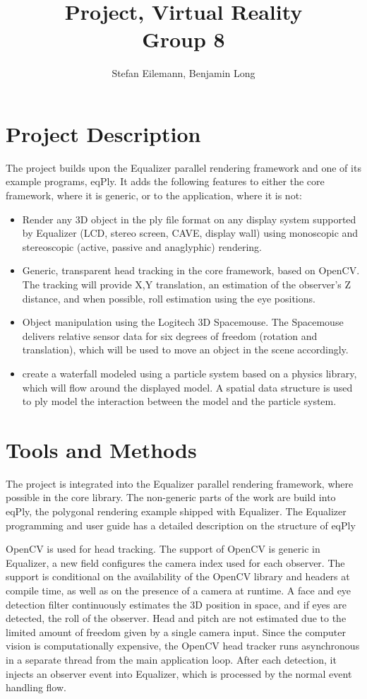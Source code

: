 \documentclass[10pt,a4]{scrartcl}
\title{Project, Virtual Reality\\Group 8}
\author{Stefan Eilemann, Benjamin Long}
\begin{document}
\maketitle

\section{Project Description}

The project builds upon the Equalizer parallel rendering framework and one of
its example programs, eqPly. It adds the following features to either the
core framework, where it is generic, or to the application, where it is not:
\begin{itemize}
\item Render any 3D object in the ply file format on any display system
  supported by Equalizer (LCD, stereo screen, CAVE, display wall) using
  monoscopic and stereoscopic (active, passive and anaglyphic) rendering.
\item Generic, transparent head tracking in the core framework, based on
  OpenCV. The tracking will provide X,Y translation, an estimation of the
  observer's Z distance, and when possible, roll estimation using the eye
  positions.
\item Object manipulation using the Logitech 3D Spacemouse. The Spacemouse
  delivers relative sensor data for six degrees of freedom (rotation and
  translation), which will be used to move an object in the scene accordingly.
\item create a waterfall modeled using a particle system based on a physics
  library, which will flow around the displayed model. A spatial data structure
  is used to ply model the interaction between the model and the particle
  system.
\end{itemize}

\section{Tools and Methods}

The project is integrated into the Equalizer parallel rendering framework, where
possible in the core library. The non-generic parts of the work are build into
\textsf{eqPly}, the polygonal rendering example shipped with Equalizer. The
Equalizer programming and user guide has a detailed description on the structure
of \textsf{eqPly}

OpenCV is used for head tracking. The support of OpenCV is generic in Equalizer,
a new field configures the camera index used for each observer. The support is
conditional on the availability of the OpenCV library and headers at compile
time, as well as on the presence of a camera at runtime. A face and eye
detection filter continuously estimates the 3D position in space, and if eyes
are detected, the roll of the observer. Head and pitch are not estimated due to
the limited amount of freedom given by a single camera input. Since the computer
vision is computationally expensive, the OpenCV head tracker runs asynchronous
in a separate thread from the main application loop. After each detection, it
injects an observer event into Equalizer, which is processed by the normal event
handling flow.
\end{document}
